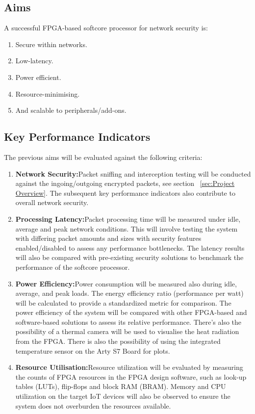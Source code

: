\subsection{Aims}
A successful FPGA-based softcore processor for network security is:
\begin{enumerate}
    \item Secure within networks.
    \item Low-latency.
    \item Power efficient.
    \item Resource-minimising.
    \item And scalable to peripherals/add-ons.
\end{enumerate}

\subsection{Key Performance Indicators}
The previous aims will be evaluated against the following criteria:
\begin{enumerate}
    \item\textbf{Network Security:}\newline Packet sniffing and interception testing will be conducted against the ingoing/outgoing encrypted packets, see section ~\ref{sec:Project Overview}. The subsequent key performance indicators also contribute to overall network security.
    \item\textbf{Processing Latency:}\newline Packet processing time will be measured under idle, average and peak network conditions. This will involve testing the system with differing packet amounts and sizes with security features enabled/disabled to assess any performance bottlenecks. The latency results will also be compared with pre-existing security solutions to benchmark the performance of the softcore processor.
    \item\textbf{Power Efficiency:}\newline Power consumption will be measured also during idle, average, and peak loads. The energy efficiency ratio (performance per watt) will be calculated to provide a standardized metric for comparison. The power efficiency of the system will be compared with other FPGA-based and software-based solutions to assess its relative performance. There's also the possibility of a thermal camera will be used to visualise the heat radiation from the FPGA. There is also the possibility of using the integrated temperature sensor on the Arty S7 Board \cite{ArtyS7RefManual} for plots.
    \item\textbf{Resource Utilisation:}\newline Resource utilization will be evaluated by measuring the counts of FPGA resources in the FPGA design software, such as look-up tables (LUTs), flip-flops and block RAM (BRAM). Memory and CPU utilization on the target IoT devices will also be observed to ensure the system does not overburden the resources available.
\end{enumerate}

